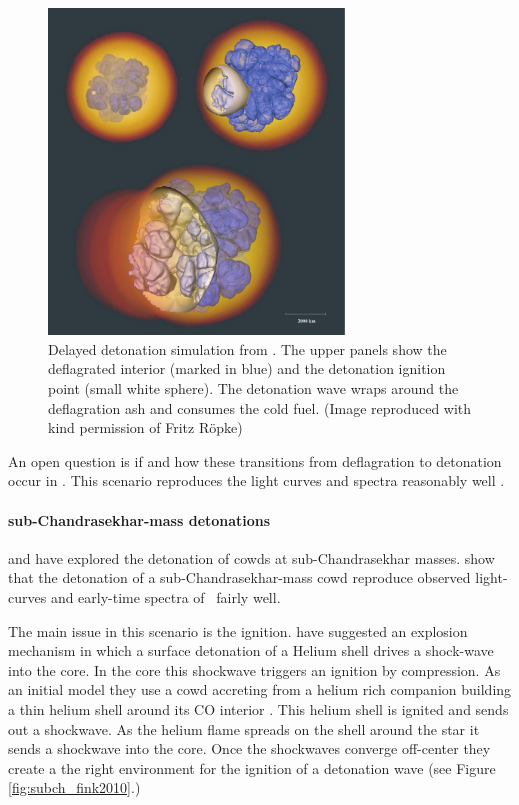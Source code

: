 \begin{figure}[htbp] %
   \centering
   \includegraphics[width=0.7\textwidth]{chapter_intro/plots/ddt_roepke08.pdf}
   \caption{ Delayed detonation simulation from \citet{2008NJPh...10l5009R}. The upper panels show the deflagrated interior (marked in blue) and the detonation ignition point (small white sphere). The detonation wave wraps around the deflagration ash and consumes the cold fuel. (Image reproduced with kind permission of Fritz R\"{o}pke)}
   \label{fig:snia_ddt_roepke2007}
\end{figure}

An open question is if and how these transitions from deflagration to detonation occur in \sneia. This scenario reproduces the light curves and spectra reasonably well \citep{2009Natur.460..869K}. 


\paragraph{sub-Chandrasekhar-mass detonations}
\label{sec:subchandra}
\citet{1992ApJ...386L..13S} and \citet{2010ApJ...714L..52S} have explored the detonation of \glspl{cowd} at sub-Chandrasekhar masses.  \citet{2010ApJ...714L..52S} show that the detonation of a sub-Chandrasekhar-mass \gls{cowd} reproduce observed light-curves and early-time spectra of \sneia\ fairly well.

The main issue in this scenario is the ignition. \cite{2010A&A...514A..53F} have suggested an explosion mechanism in which a surface detonation of a Helium shell drives a shock-wave into the core. In the core this shockwave triggers an ignition by compression.  As an initial model they use a \gls{cowd} accreting from a helium rich companion building a thin helium shell around its CO interior \citep[described in][]{2007ApJ...662L..95B}. This helium shell is ignited and sends out a shockwave. As the helium flame spreads on the shell around the star it sends a shockwave into the core. Once 
the shockwaves converge off-center they create a the right environment for the ignition of a detonation wave (see Figure \ref{fig:subch_fink2010}.) 

